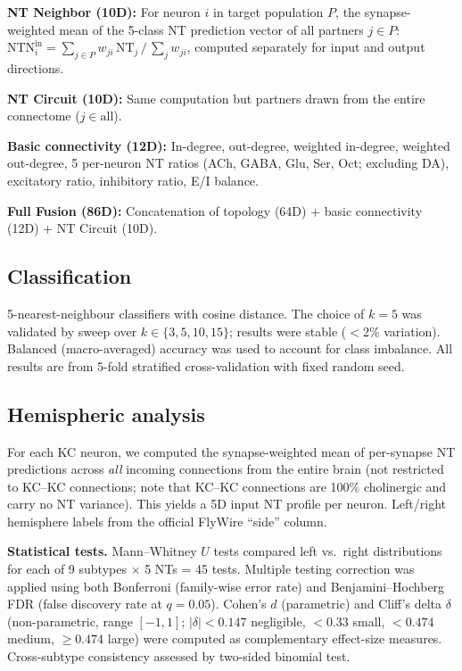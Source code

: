 \documentclass[10pt]{article}
\begin{document}
\textbf{NT Neighbor (10D):} For neuron $i$ in target population $P$, the synapse-weighted mean of the 5-class NT prediction vector of all partners $j \in P$: $\mathrm{NTN}_i^{\mathrm{in}} = \sum_{j \in P} w_{ji}\, \mathrm{NT}_j \,/\, \sum_{j} w_{ji}$, computed separately for input and output directions.

\textbf{NT Circuit (10D):} Same computation but partners drawn from the entire connectome ($j \in \mathrm{all}$).

\textbf{Basic connectivity (12D):} In-degree, out-degree, weighted in-degree, weighted out-degree, 5 per-neuron NT ratios (ACh, GABA, Glu, Ser, Oct; excluding DA), excitatory ratio, inhibitory ratio, E/I balance.

\textbf{Full Fusion (86D):} Concatenation of topology (64D) + basic connectivity (12D) + NT Circuit (10D).

\subsection*{Classification}
5-nearest-neighbour classifiers with cosine distance. The choice of $k = 5$ was validated by sweep over $k \in \{3, 5, 10, 15\}$; results were stable ($<$2\% variation). Balanced (macro-averaged) accuracy was used to account for class imbalance. All results are from 5-fold stratified cross-validation with fixed random seed.

\subsection*{Hemispheric analysis}
For each KC neuron, we computed the synapse-weighted mean of per-synapse NT predictions across \textit{all} incoming connections from the entire brain (not restricted to KC--KC connections; note that KC--KC connections are 100\% cholinergic and carry no NT variance). This yields a 5D input NT profile per neuron. Left/right hemisphere labels from the official FlyWire ``side'' column.

\textbf{Statistical tests.} Mann--Whitney $U$ tests compared left vs.\ right distributions for each of 9 subtypes $\times$ 5 NTs = 45 tests. Multiple testing correction was applied using both Bonferroni (family-wise error rate) and Benjamini--Hochberg FDR (false discovery rate at $q = 0.05$). Cohen's $d$ (parametric) and Cliff's delta $\delta$ (non-parametric, range $[-1, 1]$; $|\delta| < 0.147$ negligible, $< 0.33$ small, $< 0.474$ medium, $\geq 0.474$ large) were computed as complementary effect-size measures. Cross-subtype consistency assessed by two-sided binomial test.
\end{document}
